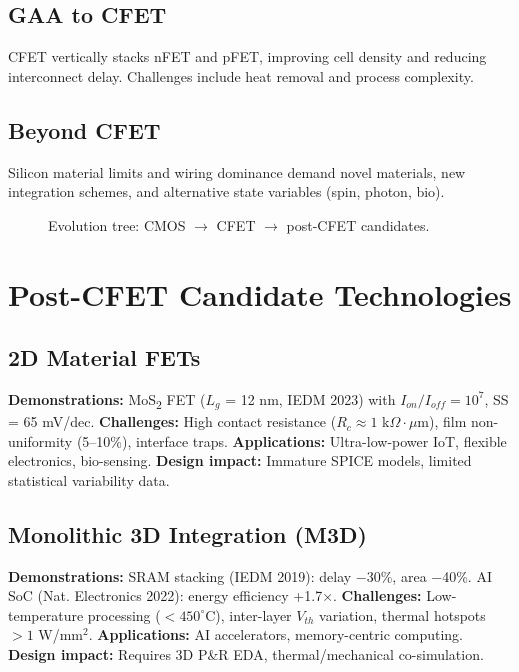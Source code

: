 \documentclass[conference]{IEEEtran}
\newcommand{\figpath}{figures}     %
\newcommand{\tikzcol}[2][\linewidth]{%
  \resizebox{#1}{!}{}}
\begin{document}
\subsection{GAA to CFET}
CFET vertically stacks nFET and pFET, improving cell density and reducing interconnect delay. Challenges include heat removal and process complexity.

\subsection{Beyond CFET}
Silicon material limits and wiring dominance demand novel materials, new integration schemes, and alternative state variables (spin, photon, bio).

\begin{figure*}[!t]
  \centering
  \tikzcol[0.9\textwidth]{\figpath/evolution_tree.tex}
  \caption{Evolution tree: CMOS $\rightarrow$ CFET $\rightarrow$ post-CFET candidates.}
  \label{fig:evolution}
\end{figure*}

\section{Post-CFET Candidate Technologies}

\subsection{2D Material FETs}
\textbf{Demonstrations:} MoS\textsubscript{2} FET ($L_g$ = 12 nm, IEDM 2023) with $I_{on}/I_{off}=10^7$, SS = 65 mV/dec.  
\textbf{Challenges:} High contact resistance ($R_c \approx 1$ k$\Omega \cdot \mu$m), film non-uniformity (5–10\%), interface traps.  
\textbf{Applications:} Ultra-low-power IoT, flexible electronics, bio-sensing.  
\textbf{Design impact:} Immature SPICE models, limited statistical variability data.

\subsection{Monolithic 3D Integration (M3D)}
\textbf{Demonstrations:} SRAM stacking (IEDM 2019): delay −30\%, area −40\%. AI SoC (Nat. Electronics 2022): energy efficiency +1.7×.  
\textbf{Challenges:} Low-temperature processing ($<450^{\circ}$C), inter-layer $V_{th}$ variation, thermal hotspots $>1$ W/mm$^2$.  
\textbf{Applications:} AI accelerators, memory-centric computing.  
\textbf{Design impact:} Requires 3D P\&R EDA, thermal/mechanical co-simulation.
\end{document}
